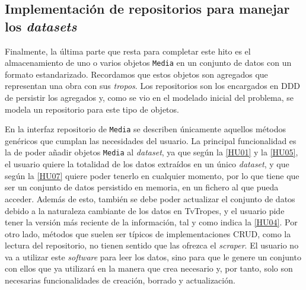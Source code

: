 \subsection{Implementación de repositorios para manejar los \textit{datasets}}
Finalmente, la última parte que resta para completar este hito es el
almacenamiento de uno o varios objetos \texttt{Media} en un conjunto de datos
con un formato estandarizado. Recordamos que estos objetos son agregados que
representan una obra con sus \textit{tropos}. Los repositorios son los
encargados en DDD de persistir los agregados y, como se vio en el modelado
inicial del problema, se modela un repositorio para este tipo de objetos.

En la interfaz repositorio de \texttt{Media} se describen únicamente aquellos métodos
genéricos que cumplan las necesidades del usuario. La principal funcionalidad es
la de poder añadir objetos \texttt{Media} al \textit{dataset}, ya que según la
\href{https://github.com/jlgallego99/TropesToGo/issues/6}{[HU01]} y la
\href{https://github.com/jlgallego99/TropesToGo/issues/30}{[HU05]}, el usuario
quiere la totalidad de los datos extraídos en un único \textit{dataset}, y que
según la \href{https://github.com/jlgallego99/TropesToGo/issues/46}{[HU07]}
quiere poder tenerlo en cualquier momento, por lo que tiene que ser un conjunto
de datos persistido en memoria, en un fichero al que pueda acceder. Además de
esto, también se debe poder actualizar el conjunto de datos debido a la
naturaleza cambiante de los datos en TvTropes, y el usuario pide tener la
versión más reciente de la información, tal y como indica la
\href{https://github.com/jlgallego99/TropesToGo/issues/9}{[HU04]}. Por otro
lado, métodos que suelen ser típicos de implementaciones CRUD, como la lectura
del repositorio, no tienen sentido que las ofrezca el \textit{scraper}. El
usuario no va a utilizar este \textit{software} para leer los datos, sino para
que le genere un conjunto con ellos que ya utilizará en la manera que crea
necesario y, por tanto, solo son necesarias funcionalidades de creación, borrado
y actualización.

